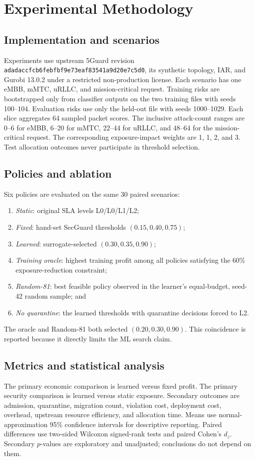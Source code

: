 \documentclass[conference]{IEEEtran}
\begin{document}
\section{Experimental Methodology}
\subsection{Implementation and scenarios}
Experiments use upstream 5Guard revision
\texttt{adadaccfcb6febfbf9e73eaf83541a9d20e7c5d0}, its synthetic topology, IAR,
and Gurobi 13.0.2 under a restricted non-production license. Each scenario has
one eMBB, mMTC, uRLLC, and mission-critical request. Training risks are
bootstrapped only from classifier outputs on the two training files with seeds
100--104. Evaluation risks use only the held-out file with seeds 1000--1029.
Each slice aggregates 64 sampled packet scores. The inclusive attack-count
ranges are 0--6 for eMBB, 6--20 for mMTC, 22--44 for uRLLC, and 48--64 for the
mission-critical request. The corresponding exposure-impact weights are 1, 1,
2, and 3. Test allocation outcomes never participate in threshold selection.

\subsection{Policies and ablation}
Six policies are evaluated on the same 30 paired scenarios:
\begin{enumerate}
  \item \emph{Static}: original SLA levels L0/L0/L1/L2;
  \item \emph{Fixed}: hand-set SecGuard thresholds $(0.15,0.40,0.75)$;
  \item \emph{Learned}: surrogate-selected $(0.30,0.35,0.90)$;
  \item \emph{Training oracle}: highest training profit among all policies
  satisfying the 60\% exposure-reduction constraint;
  \item \emph{Random-81}: best feasible policy observed in the learner's
  equal-budget, seed-42 random sample; and
  \item \emph{No quarantine}: the learned thresholds with quarantine decisions
  forced to L2.
\end{enumerate}
The oracle and Random-81 both selected $(0.20,0.30,0.90)$. This coincidence is
reported because it directly limits the ML search claim.

\subsection{Metrics and statistical analysis}
The primary economic comparison is learned versus fixed profit. The primary
security comparison is learned versus static exposure. Secondary outcomes are
admission, quarantine, migration count, violation cost, deployment cost,
overhead, upstream resource efficiency, and allocation time. Means use
normal-approximation 95\% confidence intervals for descriptive reporting.
Paired differences use two-sided Wilcoxon signed-rank tests and paired Cohen's
$d_z$. Secondary $p$-values are exploratory and unadjusted; conclusions do not
depend on them.
\end{document}
